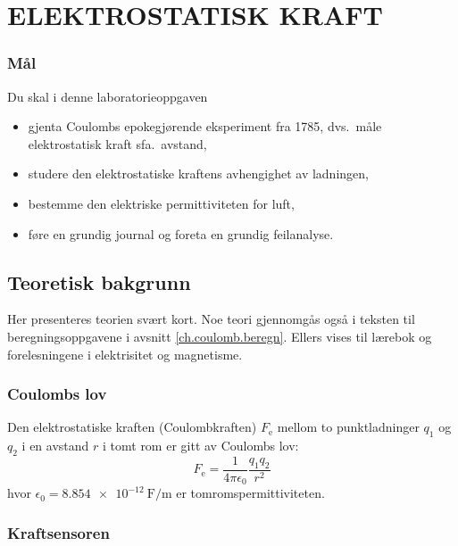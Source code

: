 \documentclass[../Elmag-labhefte-2020.tex]{subfiles}
\begin{document}
\chapter{ELEKTROSTATISK KRAFT \label{ch.coulomb}}

\subsection*{Mål}

Du skal i denne laboratorieoppgaven
%
\begin{itemize}
\item gjenta Coulombs epokegjørende eksperiment fra 1785, dvs.\ måle elektrostatisk kraft sfa.\ avstand,
\item studere den elektrostatiske kraftens avhengighet av ladningen,
\item bestemme den elektriske permittiviteten for luft,
\item føre en grundig journal og foreta en grundig feilanalyse.
\end{itemize}
%


\section{Teoretisk bakgrunn}

Her presenteres teorien svært kort. Noe teori gjennomgås også i teksten til beregningsoppgavene i avsnitt \ref{ch.coulomb.beregn}. Ellers vises til lærebok og forelesningene i elektrisitet og magnetisme.

\subsection{Coulombs lov}

Den elektrostatiske kraften (Coulombkraften) $F_\text{e}$ mellom to punktladninger $q_1$ og $q_2$ i en avstand $r$ i tomt rom  er gitt av Coulombs lov:
\begin{equation}
    F_\text{e}
        = \frac{1}{4\pi\epsilon_0} \frac{q_1 q_2}{r^2}
    \label{eq:coulomb}
\end{equation}
hvor $\epsilon_0 = \SI{8,854e-12}{\farad/\m}$ er tomromspermittiviteten. 

\subsection{Kraftsensoren}
\label{subsec.kraftsensor}
\end{document}
